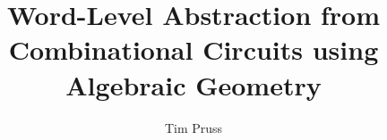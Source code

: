 \documentclass[Chicago]{uuthesis2e}
\title{Word-Level Abstraction from Combinational Circuits using Algebraic Geometry}
\author{Tim Pruss}
\newcommand{\ls}[1]
    {\dimen0=\fontdimen6\the\font
     \lineskip=#1\dimen0
     \advance\lineskip.5\fontdimen5\the\font
     \advance\lineskip-\dimen0
     \lineskiplimit=.9\lineskip
     \baselineskip=\lineskip
     \advance\baselineskip\dimen0
     \normallineskip\lineskip
     \normallineskiplimit\lineskiplimit
     \normalbaselineskip\baselineskip
     \ignorespaces
    }
\begin{document}

\frontmatterformat
\titlepage
\copyrightpage
\committeeapproval
\readingapproval

\tableofcontents
\listoffigures
\listoftables


\maintext       %










%
%






\end{document}
